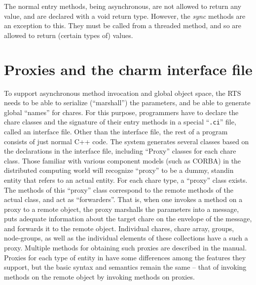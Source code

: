 The normal entry methods, being asynchronous, are not allowed to return
any value, and are declared with a void return type. However, the {\em
sync} methods are an exception to this. They must be called from a
threaded method, and so are allowed to return (certain types of)
values.  

\section{Proxies and the charm interface file}
\label{proxies}

To support asynchronous method invocation and global object space, the
RTS needs to be able to serialize (``marshall'') the parameters, and
be able to generate global ``names'' for chares. For this purpose,
programmers have to declare the chare classes and the signature of
their entry methods in a special ``\verb#.ci#'' file, called an
interface file. Other than the interface file, the rest of a \charm
program consists of just normal C++ code. The system generates several
classes based on the declarations in the interface file, including
``Proxy'' classes for each chare class.
Those familiar with various component models (such as CORBA) in the
distributed computing world will recognize ``proxy'' to be a dummy, standin
entity that refers to an actual entity.  For each chare type, a ``proxy''
class exists.
The methods of
this ``proxy'' class correspond to the remote methods of the actual class, and
act as ``forwarders''. That is, when one invokes a method on a proxy to a
remote object, the proxy marshalls the parameters into a message, puts
adequate information about the target chare on the envelope of the
message, and forwards it to the
remote object. 
Individual chares, chare array, groups, node-groups, as well as the
individual elements of these collections have a such a
proxy. Multiple methods for obtaining such proxies are described in
the manual.
Proxies for each type of entity in \charm
have some differences among the features they support, but the basic
syntax and semantics remain the same -- that of invoking methods on
the remote object by invoking methods on proxies.




